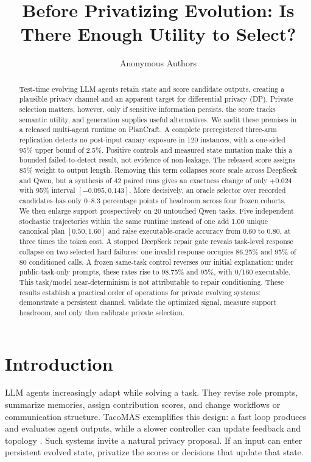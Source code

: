 \documentclass{article}
\title{Before Privatizing Evolution: Is There Enough Utility to Select?}
\author{Anonymous Authors}
\begin{document}
\maketitle

\begin{abstract}
 Test-time evolving LLM agents retain state and score candidate outputs, creating a plausible privacy channel and an apparent target for differential privacy (DP). Private selection matters, however, only if sensitive information persists, the score tracks semantic utility, and generation supplies useful alternatives. We audit these premises in a released multi-agent runtime on PlanCraft. A complete preregistered three-arm replication detects no post-input canary exposure in 120 instances, with a one-sided 95\% upper bound of 2.5\%. Positive controls and measured state mutation make this a bounded failed-to-detect result, not evidence of non-leakage. The released score assigns 85\% weight to output length. Removing this term collapses score scale across DeepSeek and Qwen, but a synthesis of 42 paired runs gives an exactness change of only $+0.024$ with 95\% interval $[-0.095,0.143]$. More decisively, an oracle selector over recorded candidates has only 0--8.3 percentage points of headroom across four frozen cohorts. We then enlarge support prospectively on 20 untouched Qwen tasks. Five independent stochastic trajectories within the same runtime instead of one add 1.00 unique canonical plan $[0.50,1.60]$ and raise executable-oracle accuracy from 0.60 to 0.80, at three times the token cost. A stopped DeepSeek repair gate reveals task-level response collapse on two selected hard failures: one invalid response occupies 86.25\% and 95\% of 80 conditioned calls. A frozen same-task control reverses our initial explanation: under public-task-only prompts, these rates rise to 98.75\% and 95\%, with 0/160 executable. This task/model near-determinism is not attributable to repair conditioning. These results establish a practical order of operations for private evolving systems: demonstrate a persistent channel, validate the optimized signal, measure support headroom, and only then calibrate private selection.
\end{abstract}

\section{Introduction}

LLM agents increasingly adapt while solving a task. They revise role prompts, summarize memories, assign contribution scores, and change workflows or communication structure. TacoMAS exemplifies this design: a fast loop produces and evaluates agent outputs, while a slower controller can update feedback and topology \citep{xu2026tacomas}. Such systems invite a natural privacy proposal. If an input can enter persistent evolved state, privatize the scores or decisions that update that state.
\end{document}
